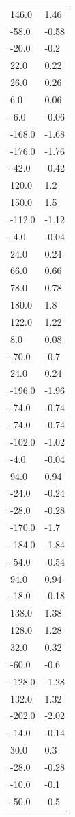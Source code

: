 \begin{longtable}{ll}
146.0 & 1.46 \\
-58.0 & -0.58 \\
-20.0 & -0.2 \\
22.0 & 0.22 \\
26.0 & 0.26 \\
6.0 & 0.06 \\
-6.0 & -0.06 \\
-168.0 & -1.68 \\
-176.0 & -1.76 \\
-42.0 & -0.42 \\
120.0 & 1.2 \\
150.0 & 1.5 \\
-112.0 & -1.12 \\
-4.0 & -0.04 \\
24.0 & 0.24 \\
66.0 & 0.66 \\
78.0 & 0.78 \\
180.0 & 1.8 \\
122.0 & 1.22 \\
8.0 & 0.08 \\
-70.0 & -0.7 \\
24.0 & 0.24 \\
-196.0 & -1.96 \\
-74.0 & -0.74 \\
-74.0 & -0.74 \\
-102.0 & -1.02 \\
-4.0 & -0.04 \\
94.0 & 0.94 \\
-24.0 & -0.24 \\
-28.0 & -0.28 \\
-170.0 & -1.7 \\
-184.0 & -1.84 \\
-54.0 & -0.54 \\
94.0 & 0.94 \\
-18.0 & -0.18 \\
138.0 & 1.38 \\
128.0 & 1.28 \\
32.0 & 0.32 \\
-60.0 & -0.6 \\
-128.0 & -1.28 \\
132.0 & 1.32 \\
-202.0 & -2.02 \\
-14.0 & -0.14 \\
30.0 & 0.3 \\
-28.0 & -0.28 \\
-10.0 & -0.1 \\
-50.0 & -0.5 \\

\end{longtable}
